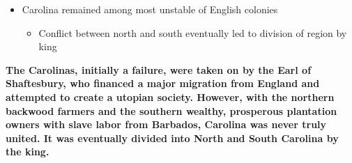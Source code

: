 \documentclass[a4paper]{article}
\begin{document}
{\begin{itemize}
\begin{itemize}
\begin{itemize}
                \item Close ties with Barbados (made up majority of new migrants)
                \begin{itemize}
                    \item Many arrived with African workers, becoming landlords
                    \item Barbadian migrants established similar slave-based system to what had existed on Barbados, continuing in African slave trade
                \end{itemize}
            \end{itemize}
        \end{itemize}
        \item Carolina remained among most unstable of English colonies
        \begin{itemize}
            \item Conflict between north and south eventually led to division of region by king
        \end{itemize}
    \end{itemize}
    \textbf{The Carolinas, initially a failure, were taken on by the Earl of Shaftesbury, who financed a major migration from England and attempted to create a utopian society. However, with the northern backwood farmers and the southern wealthy, prosperous plantation owners with slave labor from Barbados, Carolina was never truly united. It was eventually divided into North and South Carolina by the king.}
    }
\end{document}
